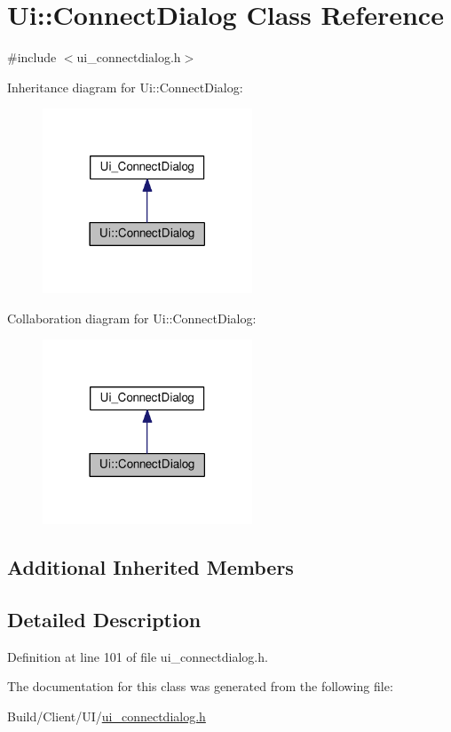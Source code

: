 \hypertarget{class_ui_1_1_connect_dialog}{}\section{Ui\+:\+:Connect\+Dialog Class Reference}
\label{class_ui_1_1_connect_dialog}


{\ttfamily \#include $<$ui\+\_\+connectdialog.\+h$>$}



Inheritance diagram for Ui\+:\+:Connect\+Dialog\+:
\nopagebreak
\begin{figure}[H]
\begin{center}
\leavevmode
\includegraphics[width=177pt]{class_ui_1_1_connect_dialog__inherit__graph}
\end{center}
\end{figure}


Collaboration diagram for Ui\+:\+:Connect\+Dialog\+:
\nopagebreak
\begin{figure}[H]
\begin{center}
\leavevmode
\includegraphics[width=177pt]{class_ui_1_1_connect_dialog__coll__graph}
\end{center}
\end{figure}
\subsection*{Additional Inherited Members}


\subsection{Detailed Description}


Definition at line 101 of file ui\+\_\+connectdialog.\+h.



The documentation for this class was generated from the following file\+:\begin{DoxyCompactItemize}
\item 
Build/\+Client/\+U\+I/\hyperlink{ui__connectdialog_8h}{ui\+\_\+connectdialog.\+h}\end{DoxyCompactItemize}
